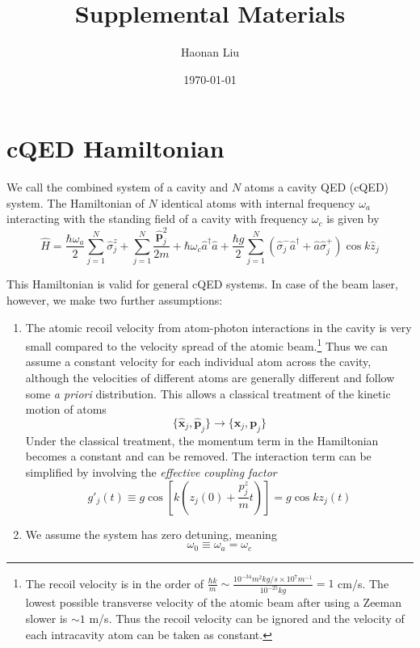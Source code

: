 \documentclass{article}
\title{Supplemental Materials}
\author{Haonan Liu}
\date{\today}
\newcommand{\omea}{\omega_a}
\newcommand{\omec}{\omega_c}
\newcommand{\szj}{\hat{\sigma}^z_j}
\newcommand{\spj}{\hat{\sigma}^+_j}
\newcommand{\smj}{\hat{\sigma}^-_j}
\begin{document}
\maketitle
\section{cQED Hamiltonian}
We call the combined system of a cavity and $N$ atoms a cavity QED (cQED) system. The Hamiltonian of $N$ identical atoms with internal frequency $\omea$ interacting with the standing field of a cavity with frequency $\omec$ is given by
\begin{equation}
\label{hamil_cqed}
    \hat{H} = \frac{\hbar \omea}{2}\sum^{N}_{j=1}\szj+\sum^{N}_{j=1}\frac{\hat{\textbf{p}}_j^2}{2m}+\hbar \omec \hat{a}^\dagger \hat{a}+\frac{\hbar g}{2}\sum^{N}_{j=1}\left(\smj \hat{a}^\dagger+\hat{a}\spj\right)\cos{k\hat{z}_j}
\end{equation}

This Hamiltonian is valid for general cQED systems. In case of the beam laser, however, we make two further assumptions:
\begin{enumerate}
    \item The atomic recoil velocity from atom-photon interactions in the cavity is very small compared to the velocity spread of the atomic beam.\footnote{The recoil velocity is in the order of $\frac{\hbar k}{m} \sim \frac{10^{-34}m^2kg/s\times10^{7}m^{-1}}{10^{-25}kg} = 1$ cm/s. The lowest possible transverse velocity of the atomic beam after using a Zeeman slower is $\sim 1$ m/s. Thus the recoil velocity can be ignored and the velocity of each intracavity atom can be taken as constant.} Thus we can assume a constant velocity for each individual atom across the cavity, although the velocities of different atoms are generally different and follow some \textit{a priori} distribution. This allows a classical treatment of the kinetic motion of atoms
    \begin{equation}
        \{\hat{\textbf{x}}_j,\hat{\textbf{p}}_j\} \rightarrow \{\textbf{x}_j,\textbf{p}_j\}
    \end{equation}
    Under the classical treatment, the momentum term in the Hamiltonian becomes a constant and can be removed. The interaction term can be simplified by involving the \textit{effective coupling factor}
    \begin{equation}
        g'_j(t)  \equiv g\cos\left[k\left(z_j(0)+\frac{p^z_j}{m}t\right)\right] = g\cos k z_j(t)
    \end{equation}
    
    \item We assume the system has zero detuning, meaning
    \begin{equation}
        \omega_0 \equiv \omea = \omec
    \end{equation}
    
\end{enumerate}
\end{document}
